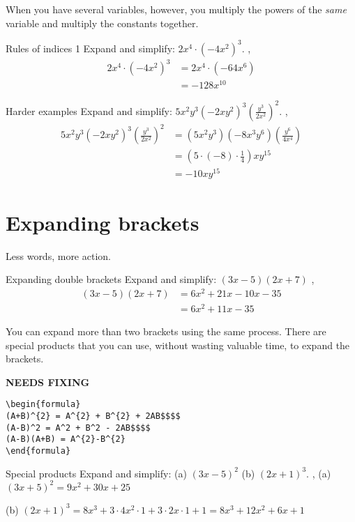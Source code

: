 When you have several variables, however, you multiply the powers of the \textit{same} variable and multiply the constants together.
\begin{example}{Rules of indices 1}
Expand and simplify: $2x^4\cdot(-4x^2)^3$.
\sep
\begin{align}
    2x^4\cdot(-4x^2)^3 & = 2x^4\cdot\left(-64x^6\right)\\&= -128x^{10}
\end{align}
\end{example}
\begin{example}{Harder examples}
Expand and simplify: $5x^{2}y^{3}\left(-2xy^{2}\right)^{3}\left(\frac {y^{3}}{2x^{2}}\right)^{2}$.
\sep
\begin{align}
5x^{2}y^{3}\left(-2xy^{2}\right)^{3}\left(\frac{y^3}{2x^2}\right)^{2}&= (5x^{2}y^{3})\left(-8x^{3}y^{6}\right)\left(\frac{y^{6}}{4x^{4}}\right) \\
    &= \left(5\cdot(-8)\cdot\frac{1}{4}\right)xy^{15}\\
    &=-10xy^{15} 
\end{align}
\end{example}

\section{Expanding brackets}
Less words, more action.

\begin{example}{Expanding double brackets}
Expand and simplify: $(3x-5)(2x+7)$
\sep
\begin{align}
(3x-5)(2x+7) & = 6x^2 + 21x - 10x - 35\\&= 6x^2 + 11x - 35
\end{align}
\end{example}

You can expand more than two brackets using the same process.
There are special products that you can use, without wasting valuable time, to expand the brackets.


{\hfill\Large\bfseries NEEDS FIXING\hfill}
\begin{lstlisting}
\begin{formula}
(A+B)^{2} = A^{2} + B^{2} + 2AB$$$$
(A-B)^2 = A^2 + B^2 - 2AB$$$$
(A-B)(A+B) = A^{2}-B^{2}
\end{formula}
 \end{lstlisting}

\begin{example}{Special products}
Expand and simplify: (a) $(3x-5)^{2}$ \hspace{1cm} (b) $(2x+1)^{3}$.
\sep
(a) $(3x+5)^2=9x^2+30x+25$

(b) $(2x+1)^3=8x^3+3\cdot4x^2\cdot1+3\cdot2x\cdot1+1=8x^3+12x^2+6x+1$
\end{example}

